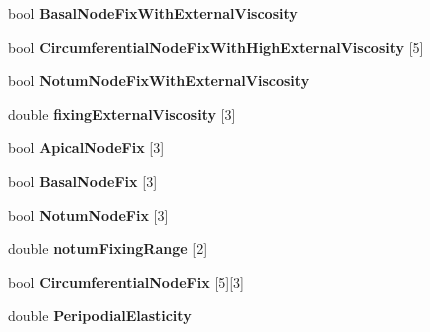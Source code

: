 \begin{DoxyCompactItemize}
\item 
\hypertarget{classSimulation_a1898c90a360862484cb379c213640fbc}{}bool {\bfseries Basal\+Node\+Fix\+With\+External\+Viscosity}\label{classSimulation_a1898c90a360862484cb379c213640fbc}

\item 
\hypertarget{classSimulation_a797bef0a4c6e90daf92f51550ee0619e}{}bool {\bfseries Circumferential\+Node\+Fix\+With\+High\+External\+Viscosity} \mbox{[}5\mbox{]}\label{classSimulation_a797bef0a4c6e90daf92f51550ee0619e}

\item 
\hypertarget{classSimulation_afcdc046caaaf16a43ee646c79902eae1}{}bool {\bfseries Notum\+Node\+Fix\+With\+External\+Viscosity}\label{classSimulation_afcdc046caaaf16a43ee646c79902eae1}

\item 
\hypertarget{classSimulation_ac00c2a04cdaf04f28dbe95f1ca6fd934}{}double {\bfseries fixing\+External\+Viscosity} \mbox{[}3\mbox{]}\label{classSimulation_ac00c2a04cdaf04f28dbe95f1ca6fd934}

\item 
\hypertarget{classSimulation_a34b767055f674bf25b1b000c60683447}{}bool {\bfseries Apical\+Node\+Fix} \mbox{[}3\mbox{]}\label{classSimulation_a34b767055f674bf25b1b000c60683447}

\item 
\hypertarget{classSimulation_a1d716c8688103f42b89242d962c9ab1b}{}bool {\bfseries Basal\+Node\+Fix} \mbox{[}3\mbox{]}\label{classSimulation_a1d716c8688103f42b89242d962c9ab1b}

\item 
\hypertarget{classSimulation_a6222749d0ee7055efb52974eacbfa074}{}bool {\bfseries Notum\+Node\+Fix} \mbox{[}3\mbox{]}\label{classSimulation_a6222749d0ee7055efb52974eacbfa074}

\item 
\hypertarget{classSimulation_a995a48098144f291dfa47773c150ed84}{}double {\bfseries notum\+Fixing\+Range} \mbox{[}2\mbox{]}\label{classSimulation_a995a48098144f291dfa47773c150ed84}

\item 
\hypertarget{classSimulation_a42120f650198d83e054144ab71e2fee2}{}bool {\bfseries Circumferential\+Node\+Fix} \mbox{[}5\mbox{]}\mbox{[}3\mbox{]}\label{classSimulation_a42120f650198d83e054144ab71e2fee2}

\item 
\hypertarget{classSimulation_a3d8435d5bedf3810cb12138538169d9c}{}double {\bfseries Peripodial\+Elasticity}\label{classSimulation_a3d8435d5bedf3810cb12138538169d9c}


\end{DoxyCompactItemize}
